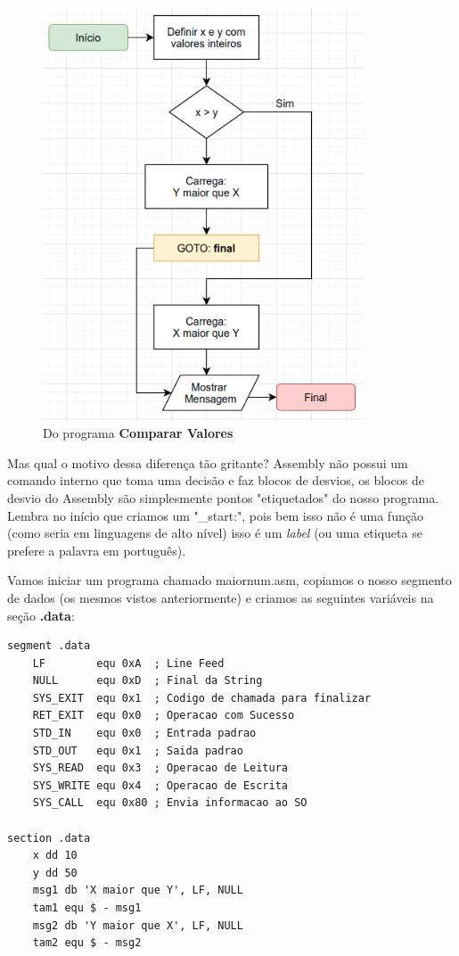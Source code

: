 \begin{figure}[ht]
\begin{minipage}[b]{0.45\linewidth}
		\includegraphics[width=0.85\textwidth]{Pictures/cap01/programa3}
		\caption{Do programa \textbf{Comparar Valores}}
	\end{minipage}
\end{figure}

Mas qual o motivo dessa diferença tão gritante? Assembly não possui um comando interno que toma uma decisão e faz blocos de desvios, os blocos de desvio do Assembly são simplesmente pontos "etiquetados" do nosso programa. Lembra no início que criamos um "\_start:", pois bem isso não é uma função (como seria em linguagens de alto nível) isso é um \textit{label} (ou uma etiqueta se prefere a palavra em português).

Vamos iniciar um programa chamado maiornum.asm, copiamos o nosso segmento de dados (os mesmos vistos anteriormente) e criamos as seguintes variáveis na seção \textbf{.data}:
\begin{lstlisting}[]
segment .data
	LF        equ 0xA  ; Line Feed
	NULL      equ 0xD  ; Final da String
	SYS_EXIT  equ 0x1  ; Codigo de chamada para finalizar
	RET_EXIT  equ 0x0  ; Operacao com Sucesso
	STD_IN    equ 0x0  ; Entrada padrao
	STD_OUT   equ 0x1  ; Saida padrao
	SYS_READ  equ 0x3  ; Operacao de Leitura
	SYS_WRITE equ 0x4  ; Operacao de Escrita
	SYS_CALL  equ 0x80 ; Envia informacao ao SO

section .data
	x dd 10
	y dd 50
	msg1 db 'X maior que Y', LF, NULL
	tam1 equ $ - msg1
	msg2 db 'Y maior que X', LF, NULL
	tam2 equ $ - msg2
\end{lstlisting}

